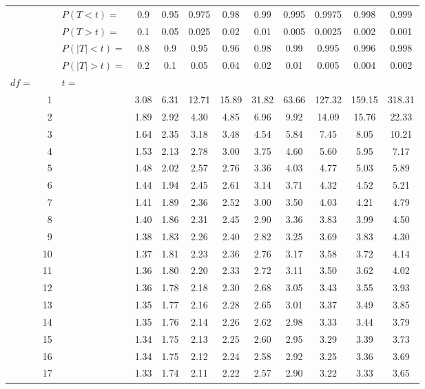 \documentclass[12pt,letterpaper]{article}
\author{Chad Worley}
\begin{document}

\begin{center}
\renewcommand{\arraystretch}{1.0}
\begin{tabular}{|l r | l c c c c c c c c c|}\hline
&& $P(T<t)=$ & 0.9 & 0.95 & 0.975 & 0.98 & 0.99 & 0.995 & 0.9975 & 0.998 & 0.999\\
&& $P(T>t)=$ & 0.1 & 0.05 & 0.025 & 0.02 & 0.01 & 0.005 & 0.0025 & 0.002 & 0.001\\
&& $P(|T|<t)=$ & 0.8 & 0.9 & 0.95 & 0.96 & 0.98 & 0.99 & 0.995 & 0.996 & 0.998\\
&& $P(|T|>t)=$ & 0.2 & 0.1 & 0.05 & 0.04 & 0.02 & 0.01 & 0.005 & 0.004 & 0.002\\\hline
$df=$ && $t=$ & & & & & & & & &\\ 
&1&& 3.08 & 6.31 & 12.71 & 15.89 & 31.82 & 63.66 & 127.32 & 159.15 & 318.31\\ 
&2&& 1.89 & 2.92 & 4.30 & 4.85 & 6.96 & 9.92 & 14.09 & 15.76 & 22.33\\ 
&3&& 1.64 & 2.35 & 3.18 & 3.48 & 4.54 & 5.84 & 7.45 & 8.05 & 10.21\\ 
&4&& 1.53 & 2.13 & 2.78 & 3.00 & 3.75 & 4.60 & 5.60 & 5.95 & 7.17\\ 
&5&& 1.48 & 2.02 & 2.57 & 2.76 & 3.36 & 4.03 & 4.77 & 5.03 & 5.89\\ 
&6&& 1.44 & 1.94 & 2.45 & 2.61 & 3.14 & 3.71 & 4.32 & 4.52 & 5.21\\ 
&7&& 1.41 & 1.89 & 2.36 & 2.52 & 3.00 & 3.50 & 4.03 & 4.21 & 4.79\\ 
&8&& 1.40 & 1.86 & 2.31 & 2.45 & 2.90 & 3.36 & 3.83 & 3.99 & 4.50\\ 
&9&& 1.38 & 1.83 & 2.26 & 2.40 & 2.82 & 3.25 & 3.69 & 3.83 & 4.30\\ 
&10&& 1.37 & 1.81 & 2.23 & 2.36 & 2.76 & 3.17 & 3.58 & 3.72 & 4.14\\ 
&11&& 1.36 & 1.80 & 2.20 & 2.33 & 2.72 & 3.11 & 3.50 & 3.62 & 4.02\\ 
&12&& 1.36 & 1.78 & 2.18 & 2.30 & 2.68 & 3.05 & 3.43 & 3.55 & 3.93\\ 
&13&& 1.35 & 1.77 & 2.16 & 2.28 & 2.65 & 3.01 & 3.37 & 3.49 & 3.85\\ 
&14&& 1.35 & 1.76 & 2.14 & 2.26 & 2.62 & 2.98 & 3.33 & 3.44 & 3.79\\ 
&15&& 1.34 & 1.75 & 2.13 & 2.25 & 2.60 & 2.95 & 3.29 & 3.39 & 3.73\\ 
&16&& 1.34 & 1.75 & 2.12 & 2.24 & 2.58 & 2.92 & 3.25 & 3.36 & 3.69\\ 
&17&& 1.33 & 1.74 & 2.11 & 2.22 & 2.57 & 2.90 & 3.22 & 3.33 & 3.65\\ 

\end{tabular}
\end{center}
\end{document}
